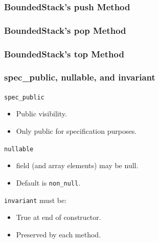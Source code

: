 \begin{frame}[fragile]
\frametitle{BoundedStack's push Method}

\end{frame}

\begin{frame}[fragile]
\frametitle{BoundedStack's pop Method}

\end{frame}

\begin{frame}[fragile]
\frametitle{BoundedStack's top Method}

\end{frame}

\begin{frame}[fragile]
\frametitle{spec\_public, nullable, and invariant}

\lstinline!spec_public!
\begin{itemize}
\item
Public visibility.

\item
Only public for specification purposes.
\end{itemize}


\lstinline!nullable!
\begin{itemize}
\item
field (and array elements) may be null.

\item
Default is \lstinline!non_null!.
\end{itemize}

\lstinline!invariant! must be:
\begin{itemize}
\item
True at end of constructor.

\item
Preserved by each method.
\end{itemize}

\end{frame}

